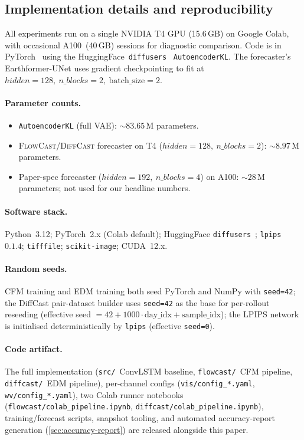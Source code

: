 \documentclass[11pt,a4paper]{article}
\begin{document}
\subsection{Implementation details and reproducibility}
\label{sec:impl}
All experiments run on a single NVIDIA T4 GPU (15.6\,GB) on Google Colab,
with occasional A100~(40\,GB) sessions for diagnostic comparison.
Code is in PyTorch~\citep{paszke2019pytorch} using the
HuggingFace~\texttt{diffusers}~\citep{vonplaten2022diffusers}
\texttt{AutoencoderKL}. The forecaster's {Earthformer-UNet} uses gradient
checkpointing to fit at $\mathit{hidden}=128,\ n\_blocks=2,\
\mathrm{batch\_size}=2$.

\paragraph{Parameter counts.}
\begin{itemize}[leftmargin=*]
\item \texttt{AutoencoderKL} (full VAE): $\sim 83.65$\,M parameters.
\item \textsc{FlowCast}/\textsc{DiffCast} forecaster on T4
      ($\mathit{hidden}=128,\ n\_blocks=2$): $\sim 8.97$\,M parameters.
\item Paper-spec forecaster ($\mathit{hidden}=192,\ n\_blocks=4$) on
      A100: $\sim 28$\,M parameters; not used for our headline numbers.
\end{itemize}

\paragraph{Software stack.} Python~3.12; PyTorch~2.x (Colab default);
HuggingFace \texttt{diffusers}~\citep{vonplaten2022diffusers};
\texttt{lpips}~$0.1.4$; \texttt{tifffile}; \texttt{scikit-image}; CUDA~12.x.

\paragraph{Random seeds.} CFM training and EDM training both seed PyTorch
and NumPy with \texttt{seed=42}; the DiffCast pair-dataset builder uses
\texttt{seed=42} as the base for per-rollout reseeding (effective seed
$= 42 + 1000 \cdot \mathrm{day\_idx} + \mathrm{sample\_idx}$); the LPIPS
network is initialised deterministically by \texttt{lpips} (effective
\texttt{seed=0}).

\paragraph{Code artifact.} The full implementation
(\texttt{src/}~ConvLSTM baseline, \texttt{flowcast/}~CFM pipeline,
\texttt{diffcast/}~EDM pipeline), per-channel configs
(\texttt{vis/config\_*.yaml}, \texttt{wv/config\_*.yaml}), two
Colab runner notebooks (\texttt{flowcast/colab\_pipeline.ipynb},
\texttt{diffcast/colab\_pipeline.ipynb}), training/forecast scripts,
snapshot tooling, and automated accuracy-report generation
(\cref{sec:accuracy-report}) are released alongside this paper.
\end{document}
